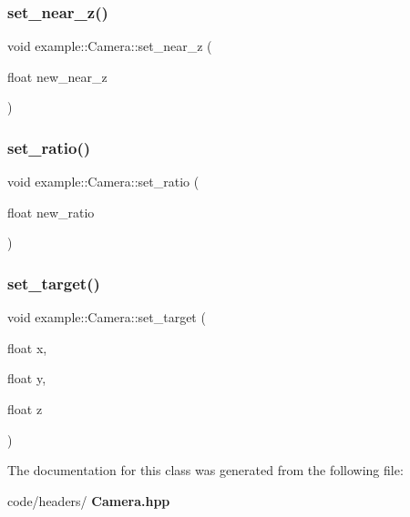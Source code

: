 \mbox{\label{classexample_1_1_camera_af112b80e00c374d3c2dd74d776222234}} 
\subsubsection{set\_near\_z()}
{\footnotesize\ttfamily void example\+::\+Camera\+::set\+\_\+near\+\_\+z (\begin{DoxyParamCaption}\item[{float}]{new\+\_\+near\+\_\+z }\end{DoxyParamCaption})\hspace{0.3cm}{\ttfamily [inline]}}

\mbox{\label{classexample_1_1_camera_a30aa3059c5ca9c5796b835bc5881dda1}} 
\subsubsection{set\_ratio()}
{\footnotesize\ttfamily void example\+::\+Camera\+::set\+\_\+ratio (\begin{DoxyParamCaption}\item[{float}]{new\+\_\+ratio }\end{DoxyParamCaption})\hspace{0.3cm}{\ttfamily [inline]}}

\mbox{\label{classexample_1_1_camera_a79232d58b96672593124b28c5c1aafa3}} 
\subsubsection{set\_target()}
{\footnotesize\ttfamily void example\+::\+Camera\+::set\+\_\+target (\begin{DoxyParamCaption}\item[{float}]{x,  }\item[{float}]{y,  }\item[{float}]{z }\end{DoxyParamCaption})\hspace{0.3cm}{\ttfamily [inline]}}



The documentation for this class was generated from the following file\+:\begin{DoxyCompactItemize}
\item 
code/headers/\textbf{ Camera.\+hpp}\end{DoxyCompactItemize}
